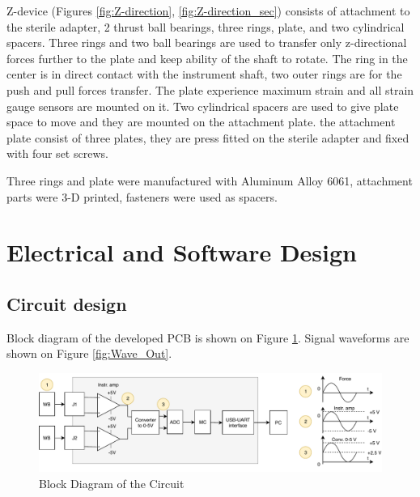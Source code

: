 Z-device (Figures \ref{fig:Z-direction}, \ref{fig:Z-direction_sec}) consists of attachment to the sterile adapter, 2 thrust ball bearings, three rings, plate, and two cylindrical spacers. Three rings and two ball bearings are used to transfer only z-directional forces further to the plate and keep ability of the shaft to rotate. The ring in the center is in direct contact with the instrument shaft, two outer rings are for the push and pull forces transfer. The plate experience maximum strain and all strain gauge sensors are mounted on it.  Two cylindrical spacers are used to give plate space to move and they are mounted on the attachment plate. the attachment plate consist of three plates, they are press fitted on the sterile adapter and fixed with four set screws.

Three rings and plate were manufactured with Aluminum Alloy 6061, attachment parts were 3-D printed, fasteners were used as spacers.


\section{Electrical and Software Design}
\label{sec:elecDes}

	\subsection{Circuit design}
	\label{sec:cirDes}
	Block diagram of the developed PCB is shown on Figure \ref{fig:PCB_block_diag}. Signal waveforms are shown on Figure \ref{fig:Wave_Out}.

\begin{figure}[h]
	\begin{center}
		\includegraphics[width=150mm]{fig/methods/PSC_block_wave.pdf}
	\end{center}
	\vspace{-4mm}
	\caption[Block diagram of the circuit]
	{Block Diagram of the Circuit}
	\label{fig:PCB_block_diag}
	\vspace{-2mm}
\end{figure}

